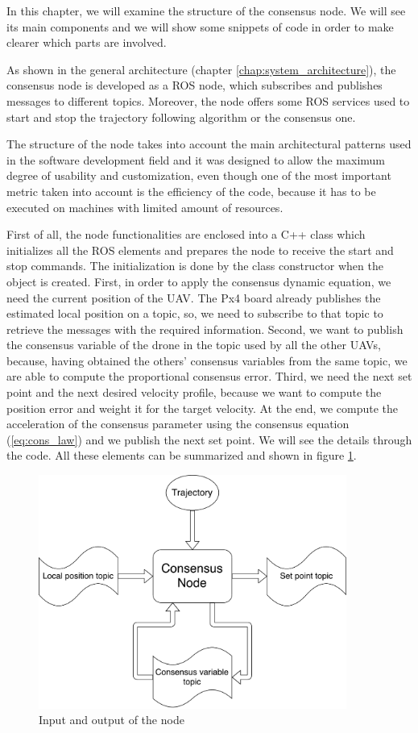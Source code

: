 In this chapter, we will examine the structure of the consensus node. We will see
its main components and we will show some snippets of code
in order to make clearer which parts are involved.

As shown in the general architecture (chapter \ref{chap:system_architecture}),
the consensus node is developed as a ROS node, which subscribes and publishes messages
to different topics.
Moreover, the node offers some ROS services used to start and stop the trajectory
following algorithm or the consensus one.

The structure of the node takes into account the main architectural patterns used
in the software development field and it was designed to allow the maximum degree
of usability and customization, even though one of the most important metric taken
into account is the efficiency of the code, because it has to be executed on
machines with limited amount of resources.

First of all, the node functionalities are enclosed into a C++ class which initializes
all the ROS elements and prepares the node to receive the start and stop commands.
The initialization is done by the class constructor when the object is created.
First, in order to apply the consensus dynamic equation, we need
the current position of the UAV. The Px4 board already publishes the estimated
local position on a topic,
so, we need to subscribe to that topic to retrieve the messages with the required
information.
Second, we want to publish the consensus variable of the drone in the topic used
by all the other UAVs, because, having obtained the others' consensus variables
from the same topic, we are able to compute the proportional consensus error.
Third, we need the next set point and the next desired velocity profile,
because we want to compute the position error and weight it for the target velocity.
At the end, we compute the acceleration of the consensus parameter using the consensus equation (\ref{eq:cons_law})
and we publish the next set point. We will see the details through the code.
All these elements can be summarized and shown in figure \ref{fig:node_in_out}.

\begin{figure}
\centering
\includegraphics[width=0.9\textwidth]{chapters/chapter-03/figures/consensus_node_structure.pdf}
\caption{Input and output of the node}
\label{fig:node_in_out}
\end{figure}

